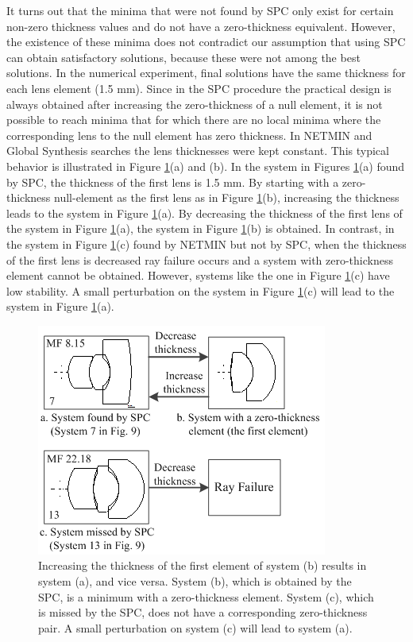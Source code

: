 It turns out that the minima that were not found by SPC only exist for certain non-zero thickness values and do not have a zero-thickness equivalent. However, the existence of these minima does not contradict our assumption that using SPC can obtain satisfactory solutions, because these were not among the best solutions. In the numerical experiment, final solutions have the same thickness for each lens element (1.5 mm). Since in the SPC procedure the practical design is always obtained after increasing the zero-thickness of a null element, it is not possible to reach minima that for which there are no local minima where the corresponding lens to the null element has zero thickness. In NETMIN and Global Synthesis searches the lens thicknesses were kept constant. This typical behavior is illustrated in Figure \ref{fig:thicknesschange}(a) and (b). In the system in Figures \ref{fig:thicknesschange}(a) found by SPC, the thickness of the first lens is 1.5 mm. By starting with a zero-thickness null-element as the first lens as in Figure \ref{fig:thicknesschange}(b), increasing the thickness leads to the system in Figure \ref{fig:thicknesschange}(a). By decreasing the thickness of the first lens of the system in Figure \ref{fig:thicknesschange}(a), the system in Figure \ref{fig:thicknesschange}(b) is obtained. In contrast, in the system in Figure \ref{fig:thicknesschange}(c) found by NETMIN but not by SPC, when the thickness of the first lens is decreased ray failure occurs and a system with zero-thickness element cannot be obtained. However, systems like the one in Figure \ref{fig:thicknesschange}(c) have low stability. A small perturbation on the system in Figure \ref{fig:thicknesschange}(c) will lead to the system in Figure \ref{fig:thicknesschange}(a).

\begin{figure}[h!]
    \centering
    \includegraphics[scale=0.7]{chapter-3/figures/thicknesschange.png}
    \caption{Increasing the thickness of the first element of system (b) results in system (a), and vice versa. System (b), which is obtained by the SPC, is a minimum with a zero-thickness element. System (c), which is missed by the SPC, does not have a corresponding zero-thickness pair. A small perturbation on system (c) will lead to system (a).}
    \label{fig:thicknesschange}
\end{figure}



